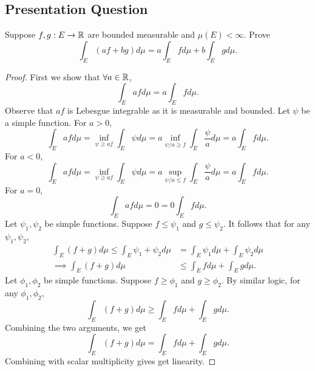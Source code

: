 \documentclass[class=book, crop=false]{standalone}
\begin{document}
        \subsection{Presentation Question}
        \begin{question}
            Suppose $f, g: E \rightarrow \mathbb{R}$ are bounded measurable and $\mu(E) < \infty$. Prove
            \begin{equation*}
                \int_{E} (af + bg) d\mu = a\int_{E} f d\mu + b \int_{E} g d\mu.
            \end{equation*}
        \end{question}

        \begin{proof}
            First we show that $\forall a \in \mathbb{R}$,
            \begin{equation*}
                \int_E af d\mu = a \int_E f d\mu.
            \end{equation*}
            Observe that $af$ is Lebesgue integrable as it is measurable and bounded. Let $\psi$ be a simple function. For $a > 0$, 
            \begin{equation*}
                \int_E af d\mu = \inf_{\psi \geq af} \int_E \psi d\mu = a \inf_{\psi / a \geq f} \int_{E} \frac{\psi}{a} d\mu = a \int_E f d\mu.
            \end{equation*}
            For $a < 0$,
            \begin{equation*}
                \int_E af d\mu = \inf_{\psi \geq af} \int_E \psi d\mu = a \sup_{\psi / a \leq f} \int_{E} \frac{\psi}{a} d\mu = a \int_E f d\mu.
            \end{equation*}
            For $a = 0$,
            \begin{equation*}
                \int_E af d\mu = 0 = 0 \int_E f d\mu.
            \end{equation*}
            Let $\psi_1, \psi_2$ be simple functions. Suppose $f \leq \psi_1$ and $g \leq \psi_2$. It follows that for any $\psi_1, \psi_2$,
            \begin{align*}
                \int_E (f + g) d\mu \leq \int_E \psi_1 + \psi_2 d\mu &= \int_E \psi_1 d\mu + \int_E \psi_2 d\mu \\
                \implies \int_E (f + g) d\mu &\leq \int_E f d\mu + \int_E g d\mu.
            \end{align*}
            Let $\phi_1, \phi_2$ be simple functions. Suppose $f \geq \phi_1$ and $g \geq \phi_2$. By similar logic, for any $\phi_1, \phi_2$,
            \begin{equation*}
                \int_E (f + g) d\mu \geq \int_E f d\mu + \int_E g d\mu.
            \end{equation*}
            Combining the two arguments, we get
            \begin{equation*}
                \int_E (f + g) d\mu = \int_E f d\mu + \int_E g d\mu.
            \end{equation*}
            Combining with scalar multiplicity gives get linearity.
        \end{proof}
\end{document}
